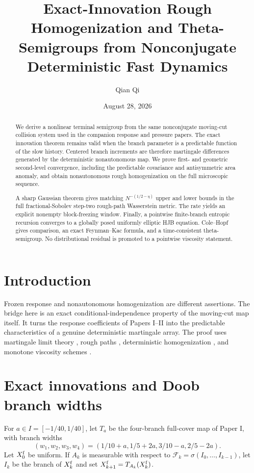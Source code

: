 \documentclass[11pt,reqno]{amsart}
\title[Exact-innovation rough homogenization]{Exact-Innovation Rough Homogenization and Theta-Semigroups from Nonconjugate Deterministic Fast Dynamics}
\author{Qian Qi}
\date{August 28, 2026}
\theoremstyle{definition}
\theoremstyle{remark}
\newcommand{\F}{\mathcal F}
\begin{document}
\begin{abstract}
We derive a nonlinear terminal semigroup from the same nonconjugate moving-cut
collision system used in the companion response and pressure papers.  The
exact innovation theorem remains valid when the branch parameter is a
predictable function of the slow history.  Centered branch increments are
therefore martingale differences generated by the deterministic nonautonomous
map.  We prove first- and geometric second-level convergence, including the
predictable covariance and antisymmetric area anomaly, and obtain
nonautonomous rough homogenization on the full microscopic sequence.

A sharp Gaussian theorem gives matching
$N^{-(1/2-\eta)}$ upper and lower bounds in the full fractional-Sobolev
step-two rough-path Wasserstein metric.  The rate yields an explicit nonempty
block-freezing window.  Finally, a pointwise finite-branch entropic recursion
converges to a globally posed uniformly elliptic HJB equation.  Cole--Hopf
gives comparison, an exact Feynman--Kac formula, and a time-consistent
theta-semigroup.  No distributional residual is promoted to a pointwise
viscosity statement.
\end{abstract}
\maketitle
\tableofcontents

\section{Introduction}
Frozen response and nonautonomous homogenization are different assertions.
The bridge here is an exact conditional-independence property of the moving-cut
map itself.  It turns the response coefficients of Papers I--II into the
predictable characteristics of a genuine deterministic martingale array.
The proof uses martingale limit theory \cite{HallHeyde1980,JacodShiryaev2003},
rough paths \cite{Lyons1998,FrizVictoir2010,FrizHairer2014}, deterministic
homogenization \cite{MelbourneStuart2011,KellyMelbourne2016,
KellyMelbourne2017,ChevyrevFrizKorepanovMelbourne2020}, and monotone viscosity
schemes \cite{BarlesSouganidis1991,CrandallIshiiLions1992}.

\section{Exact innovations and Doob branch widths}\label{sec:innovations}
For $a\in I=[-1/40,1/40]$, let $T_a$ be the four-branch full-cover map of
Paper I, with branch widths
\[
 (w_1,w_2,w_3,w_4)
 =(1/10+a,1/5+2a,3/10-a,2/5-2a).
\]
Let $X_0^{\rm f}$ be uniform.  If $A_k$ is measurable with respect to
$\F_k=\sigma(I_0,\ldots,I_{k-1})$, let $I_k$ be the branch of
$X_k^{\rm f}$ and set $X_{k+1}^{\rm f}=T_{A_k}(X_k^{\rm f})$.
\end{document}
